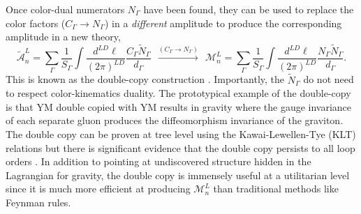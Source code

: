 \documentclass[11pt,letter]{article}
\def\be{\begin{equation}}
\begin{document}
Once color-dual numerators $N_\Gamma$ have been found, they can be
used to replace the color factors ($C_\Gamma \to N_\Gamma$) in a
\emph{different} amplitude to produce the corresponding amplitude in
a new theory,
\be\label{DCconstruction}
\tilde{\mathcal{A}}_n^L = \sum \limits_\Gamma \frac{1}{S_\Gamma} \int
\frac{d^{LD}\ell}{(2\pi)^{LD}} \frac{C_\Gamma
  \tilde{N}_\Gamma}{d_\Gamma} ~~ \xrightarrow{(C_\Gamma \to N_\Gamma)}
~~ \mathcal{M}_n^L = \sum \limits_\Gamma \frac{1}{S_\Gamma} \int
\frac{d^{LD}\ell}{(2\pi)^{LD}} \frac{N_\Gamma
  \tilde{N}_\Gamma}{d_\Gamma}.
\end{equation}
This is known as the double-copy construction \cite{BCJ,Bern:2010ue,BCJreview}.
Importantly, the $\tilde{N}_\Gamma$ do not need to respect
color-kinematics duality.  The prototypical example of the double-copy
is that YM double copied with YM results in gravity where the gauge
invariance of each separate gluon produces the diffeomorphism
invariance of the graviton.  The double copy can be proven at tree
level using the Kawai-Lewellen-Tye (KLT) relations but there is significant evidence that
the double copy persists to all loop orders \cite{FiveLoopN4,
  GeneralizedDoubleCopyFiveLoops, Bern:2018jmv, Carrasco:2021otn, KLT,
  KiermaierTalk}.  In addition to pointing at undiscovered
structure hidden in the Lagrangian for gravity, the double copy is
immensely useful at a utilitarian level since it is much more
efficient at producing $\mathcal{M}_n^L$ than traditional methods like
Feynman rules.
\end{document}
